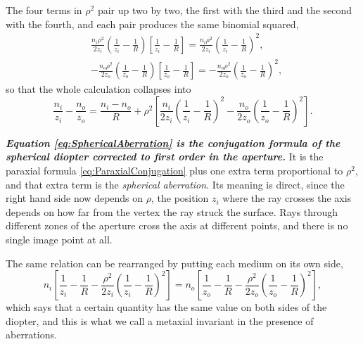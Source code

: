                 The four terms in $\rho^2$ pair up two by two, the first with the third and the second with the fourth, and each pair produces the same binomial squared,
                \begin{align*}
                    & \frac{n_i\rho^2}{2z_i}\left( \frac{1}{z_i}-\frac{1}{R} \right)\left[ \frac{1}{z_i} - \frac{1}{R} \right] = \frac{n_i\rho^2}{2z_i}\left( \frac{1}{z_i}-\frac{1}{R} \right)^2,\\
                    & -\frac{n_o\rho^2}{2z_o}\left( \frac{1}{z_o}-\frac{1}{R} \right)\left[ \frac{1}{z_o} - \frac{1}{R} \right] = -\frac{n_o\rho^2}{2z_o}\left( \frac{1}{z_o}-\frac{1}{R} \right)^2,
                \end{align*}
                so that the whole calculation collapses into
                \begin{equation}\label{eq:SphericalAberration}
                    \frac{n_i}{z_i} - \frac{n_o}{z_o} = \frac{n_i-n_o}{R} + \rho^2\left[ \frac{n_i}{2z_i}\left( \frac{1}{z_i}-\frac{1}{R} \right)^2 - \frac{n_o}{2z_o}\left( \frac{1}{z_o}-\frac{1}{R} \right)^2 \right].
                \end{equation}

                \textbf{\textit{Equation \ref{eq:SphericalAberration} is the conjugation formula of the spherical diopter corrected to first order in the aperture.}} It is the paraxial formula \ref{eq:ParaxialConjugation} plus one extra term proportional to $\rho^2$, and that extra term is the \emph{spherical aberration}. Its meaning is direct, since the right hand side now depends on $\rho$, the position $z_i$ where the ray crosses the axis depends on how far from the vertex the ray struck the surface. Rays through different zones of the aperture cross the axis at different points, and there is no single image point at all.

                The same relation can be rearranged by putting each medium on its own side,
                \begin{equation}\label{eq:MarginalInvariantEq}
                    n_i\left[ \frac{1}{z_i} - \frac{1}{R} - \frac{\rho^2}{2z_i}\left( \frac{1}{z_i}-\frac{1}{R} \right)^2 \right] = n_o\left[ \frac{1}{z_o} - \frac{1}{R} - \frac{\rho^2}{2z_o}\left( \frac{1}{z_o}-\frac{1}{R} \right)^2 \right],
                \end{equation}
                which says that a certain quantity has the same value on both sides of the diopter, and this is what we call a metaxial invariant in the presence of aberrations.

